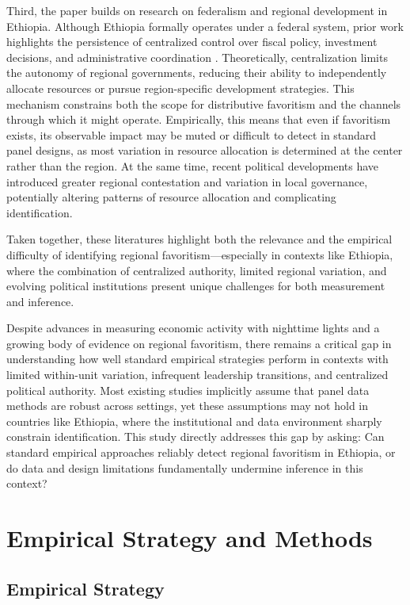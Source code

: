 \documentclass[12pt,a4paper]{article}
\begin{document}
Third, the paper builds on research on federalism and regional development in Ethiopia. Although Ethiopia formally operates under a federal system, prior work highlights the persistence of centralized control over fiscal policy, investment decisions, and administrative coordination \citep{Faguet2021, Wubneh2017}. Theoretically, centralization limits the autonomy of regional governments, reducing their ability to independently allocate resources or pursue region-specific development strategies. This mechanism constrains both the scope for distributive favoritism and the channels through which it might operate. Empirically, this means that even if favoritism exists, its observable impact may be muted or difficult to detect in standard panel designs, as most variation in resource allocation is determined at the center rather than the region. At the same time, recent political developments have introduced greater regional contestation and variation in local governance, potentially altering patterns of resource allocation and complicating identification.


Taken together, these literatures highlight both the relevance and the empirical difficulty of identifying regional favoritism—especially in contexts like Ethiopia, where the combination of centralized authority, limited regional variation, and evolving political institutions present unique challenges for both measurement and inference.

Despite advances in measuring economic activity with nighttime lights and a growing body of evidence on regional favoritism, there remains a critical gap in understanding how well standard empirical strategies perform in contexts with limited within-unit variation, infrequent leadership transitions, and centralized political authority. Most existing studies implicitly assume that panel data methods are robust across settings, yet these assumptions may not hold in countries like Ethiopia, where the institutional and data environment sharply constrain identification. This study directly addresses this gap by asking: Can standard empirical approaches reliably detect regional favoritism in Ethiopia, or do data and design limitations fundamentally undermine inference in this context?

\section{Empirical Strategy and Methods}

\subsection{Empirical Strategy}
\end{document}

